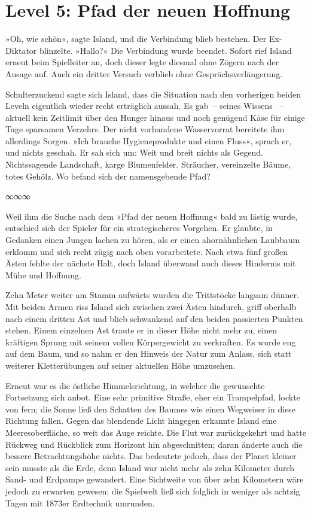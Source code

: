 \section{Level 5: Pfad der neuen Hoffnung}


»Oh, wie schön«, sagte Island, und die Verbindung blieb bestehen. Der Ex-Diktator blinzelte. »Hallo?« Die Verbindung wurde beendet. Sofort rief Island erneut beim Spielleiter an, doch dieser legte diesmal ohne Zögern nach der Ansage auf. Auch ein dritter Versuch verblieb ohne Gesprächsverlängerung.

Schulterzuckend sagte sich Island, dass die Situation nach den vorherigen beiden Leveln eigentlich wieder recht erträglich aussah. Es gab~– seines Wissens ~– aktuell kein Zeitlimit über den Hunger hinaus und noch genügend Käse für einige Tage sparsamen Verzehrs. Der nicht vorhandene Wasservorrat bereitete ihm allerdings Sorgen. »Ich brauche Hygieneprodukte und einen Fluss«, sprach er, und nichts geschah. Er sah sich um: Weit und breit nichts als Gegend. Nichtssagende Landschaft, karge Blumenfelder. Sträucher, vereinzelte Bäume, totes Gehölz. Wo befand sich der namensgebende Pfad?

\begin{center}
∞∞∞
\end{center}

Weil ihm die Suche nach dem »Pfad der neuen Hoffnung« bald zu lästig wurde, entschied sich der Spieler für ein strategischeres Vorgehen. Er glaubte, in Gedanken einen Jungen lachen zu hören, als er einen ahornähnlichen Laubbaum erklomm und sich recht zügig nach oben vorarbeitete. Nach etwa fünf großen Ästen fehlte der nächste Halt, doch Island überwand auch dieses Hindernis mit Mühe und Hoffnung.

Zehn Meter weiter am Stamm aufwärts wurden die Trittstöcke langsam dünner. Mit beiden Armen riss Island sich zwischen zwei Ästen hindurch, griff oberhalb nach einem dritten Ast und blieb schwankend auf den beiden passierten Punkten stehen. Einem einzelnen Ast traute er in dieser Höhe nicht mehr zu, einen kräftigen Sprung mit seinem vollen Körpergewicht zu verkraften. Es wurde eng auf dem Baum, und so nahm er den Hinweis der Natur zum Anlass, sich statt weiterer Kletterübungen auf seiner aktuellen Höhe umzusehen.

Erneut war es die östliche Himmelsrichtung, in welcher die gewünschte Fortsetzung sich anbot. Eine sehr primitive Straße, eher ein Trampelpfad, lockte von fern; die Sonne ließ den Schatten des Baumes wie einen Wegweiser in diese Richtung fallen. Gegen das blendende Licht hingegen erkannte Island eine Meeresoberfläche, so weit das Auge reichte. Die Flut war zurückgekehrt und hatte Rückweg und Rückblick zum Horizont hin abgeschnitten; daran änderte auch die bessere Betrachtungshöhe nichts. Das bedeutete jedoch, dass der Planet kleiner sein musste als die Erde, denn Island war nicht mehr als zehn Kilometer durch Sand- und Erdpampe gewandert. Eine Sichtweite von über zehn Kilometern wäre jedoch zu erwarten gewesen; die Spielwelt ließ sich folglich in weniger als achtzig Tagen mit 1873er Erdtechnik umrunden.

